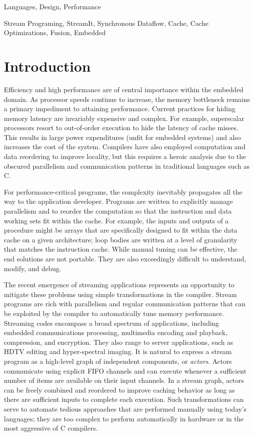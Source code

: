 \documentclass{sigplanconf}
\begin{document}
\terms 
Languages, Design, Performance

\keywords
Stream Programing, StreamIt, Synchronous Dataflow, Cache, Cache
Optimizations, Fusion, Embedded

\section{Introduction}

Efficiency and high performance are of central importance within the
embedded domain.  As processor speeds continue to increase, the memory
bottleneck remains a primary impediment to attaining performance.
Current practices for hiding memory latency are invariably expensive
and complex.  For example, superscalar processors resort to
out-of-order execution to hide the latency of cache misses.  This
results in large power expenditures (unfit for embedded systems) and
also increases the cost of the system.  Compilers have also employed
computation and data reordering to improve locality, but this requires
a heroic analysis due to the obscured parallelism and communication
patterns in traditional languages such as C.

For performance-critical programs, the complexity inevitably
propagates all the way to the application developer.  Programs are
written to explicitly manage parallelism and to reorder the
computation so that the instruction and data working sets fit within
the cache.  For example, the inputs and outputs of a procedure might
be arrays that are specifically designed to fit within the data cache
on a given architecture; loop bodies are written at a level of
granularity that matches the instruction cache.  While manual tuning
can be effective, the end solutions are not portable.  They are also
exceedingly difficult to understand, modify, and debug.

The recent emergence of streaming applications represents an
opportunity to mitigate these problems using simple transformations in
the compiler.  Stream programs are rich with parallelism and regular
communication patterns that can be exploited by the compiler to
automatically tune memory performance.  Streaming codes encompass a
broad spectrum of applications, including embedded communications
processing, multimedia encoding and playback, compression, and
encryption.  They also range to server applications, such as HDTV
editing and hyper-spectral imaging.  It is natural to express a stream
program as a high-level graph of independent components, or {\it
actors}.  Actors communicate using explicit FIFO channels and can
execute whenever a sufficient number of items are available on their
input channels.  In a stream graph, actors can be freely combined and
reordered to improve caching behavior as long as there are sufficient
inputs to complete each execution.  Such transformations can serve to
automate tedious approaches that are performed manually using today's
languages; they are too complex to perform automatically in hardware
or in the most aggressive of C compilers.
\end{document}
